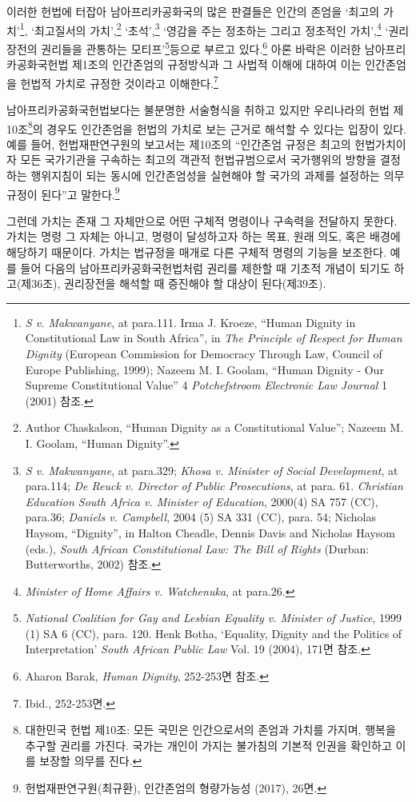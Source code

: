 이러한 헌법에 터잡아 남아프리카공화국의 많은 판결들은 인간의 존엄을 `최고의 가치'\footnote{\emph{S v. Makwanyane}, at para.111. Irma J. Kroeze, ``Human Dignity in Constitutional Law in South Africa'', in \emph{The Principle of Respect for Human Dignity} (European Commission for Democracy Through Law, Council of Europe Publishing, 1999); Nazeem M. I. Goolam, ``Human Dignity - Our Supreme Constitutional Value'' 4 \emph{Potchefstroom Electronic Law Journal} 1 (2001) 참조.}, `최고질서의 가치',\footnote{Author Chaskalson, ``Human Dignity as a Constitutional Value''; Nazeem M. I. Goolam, ``Human Dignity''.} `초석',\footnote{\emph{S v. Makwanyane}, at para.329; \emph{Khosa v. Minister of Social Development}, at para.114; \emph{De Reuck v. Director of Public Prosecutions}, at para. 61. \emph{Christian Education South Africa v. Minister of Education}, 2000(4) SA 757 (CC), para.36; \emph{Daniels v. Campbell}, 2004 (5) SA 331 (CC), para. 54; Nicholas Haysom, ``Dignity'', in Halton Cheadle, Dennis Davis and Nicholas Haysom (eds.), \emph{South African Constitutional Law: The Bill of Rights} (Durban: Butterworths, 2002) 참조.} `영감을 주는 정초하는 그리고 정초적인 가치',\footnote{\emph{Minister of Home Affairs v. Watchenuka}, at para.26.} `권리장전의 권리들을 관통하는 모티프'\footnote{\emph{National Coalition for Gay and Lesbian Equality v. Minister of Justice}, 1999 (1) SA 6 (CC), para. 120. Henk Botha, `Equality, Dignity and the Politics of Interpretation' \emph{South African Public Law} Vol. 19 (2004), 171면 참조.}등으로 부르고 있다.\footnote{Aharon Barak, \emph{Human Dignity}, 252-253면 참조.} 아론 바락은 이러한 남아프리카공화국헌법 제1조의 인간존엄의 규정방식과 그 사법적 이해에 대하여 이는 인간존엄을 헌법적 가치로 규정한 것이라고 이해한다.\footnote{Ibid., 252-253면.}

남아프리카공화국헌법보다는 불분명한 서술형식을 취하고 있지만 우리나라의 헌법 제10조\footnote{대한민국 헌법 제10조: 모든 국민은 인간으로서의 존엄과 가치를 가지며, 행복을 추구할 권리를 가진다. 국가는 개인이 가지는 불가침의 기본적 인권을 확인하고 이를 보장할 의무를 진다.}의 경우도 인간존엄을 헌법의 가치로 보는 근거로 해석할 수 있다는 입장이 있다. 예를 들어, 헌법재판연구원의 보고서는 제10조의 ``인간존엄 규정은 최고의 헌법가치이자 모든 국가기관을 구속하는 최고의 객관적 헌법규범으로서 국가행위의 방향을 결정하는 행위지침이 되는 동시에 인간존엄성을 실현해야 할 국가의 과제를 설정하는 의무규정이 된다''고 말한다.\footnote{헌법재판연구원(최규환), 인간존엄의 형량가능성 (2017), 26면.}

그런데 가치는 존재 그 자체만으로 어떤 구체적 명령이나 구속력을 전달하지 못한다. 가치는 명령 그 자체는 아니고, 명령이 달성하고자 하는 목표, 원래 의도, 혹은 배경에 해당하기 때문이다. 가치는 법규정을 매개로 다른 구체적 명령의 기능을 보조한다. 예를 들어 다음의 남아프리카공화국헌법처럼 권리를 제한할 때 기초적 개념이 되기도 하고(제36조), 권리장전을 해석할 때 증진해야 할 대상이 된다(제39조).

